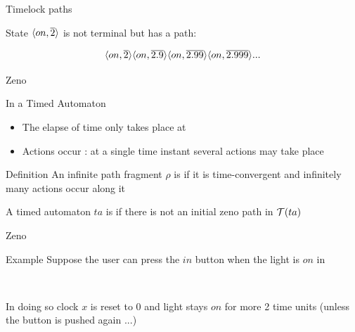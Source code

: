 \documentclass[aspectratio=169]{beamer}
\begin{document}
\begin{slide}{Timelock paths}
\small


\begin{center}
\end{center}

State $\langle on,\overline{2} \rangle$ \pause is not terminal but has a  path:

$$\langle on,\overline{2} \rangle \langle on,\overline{2.9} \rangle  \langle on,\overline{2.99} \rangle  \langle on,\overline{2.999} \rangle  ...$$

\end{slide}



\begin{slide}{Zeno}
\small

\begin{block}{In a Timed Automaton}
\begin{itemize}
\item The elapse of time only takes place at 
\item Actions occur : at a single time instant several actions may take place
\end{itemize}

\end{block}

\pause
\begin{block}{Definition}
An infinite path fragment $\rho$ is  if it is \alert{time-convergent} and
\alert{infinitely many actions occur along it}



A timed automaton $ta$ is  if there is not an initial zeno path in $\mathcal{T}(ta)$
\end{block}

\end{slide}


\begin{slide}{Zeno}
\small


\begin{block}{Example}
Suppose the user can press the $in$ button when the light is $on$ in
\begin{figure}[htb]
  \centering
  \\
\end{figure}
In doing so clock $x$ is reset to 0 and light stays $on$ for more 2 time units (unless the button is pushed again ...)
\end{block}

\end{slide}
\end{document}
